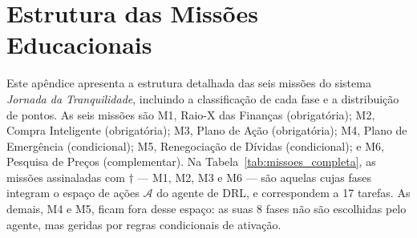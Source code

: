 
\chapter{Estrutura das Missões Educacionais}
\label{apendice:missoes}

Este apêndice apresenta a estrutura detalhada das seis missões do sistema \textit{Jornada da Tranquilidade}, incluindo a classificação de cada fase e a distribuição de pontos. As seis missões são M1, Raio-X das Finanças (obrigatória); M2, Compra Inteligente (obrigatória); M3, Plano de Ação (obrigatória); M4, Plano de Emergência (condicional); M5, Renegociação de Dívidas (condicional); e M6, Pesquisa de Preços (complementar). Na Tabela~\ref{tab:missoes_completa}, as missões assinaladas com $\dagger$ --- M1, M2, M3 e M6 --- são aquelas cujas fases integram o espaço de ações $\mathcal{A}$ do agente de DRL, e correspondem a 17 tarefas. As demais, M4 e M5, ficam fora desse espaço: as suas 8 fases não são escolhidas pelo agente, mas geridas por regras condicionais de ativação.

